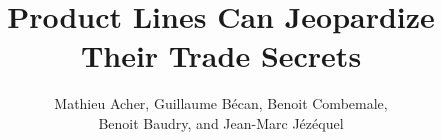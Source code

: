 \documentclass{sig-alternate}
\begin{document}
%

\title{Product Lines Can Jeopardize Their Trade Secrets}
%
%
%
%
%

%
\author{
%
%
\alignauthor
Mathieu Acher, Guillaume B\'{e}can, Benoit Combemale,\\ Benoit Baudry, and Jean-Marc J\'{e}z\'{e}quel\\
}
\end{document}
